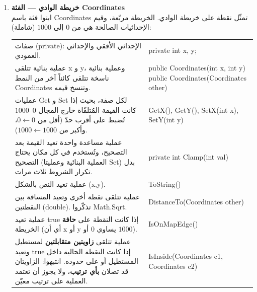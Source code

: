\documentclass[14pt]{extarticle}
\begin{document}
\begin{enumerate}[label=\textbf{تمرين \arabic*:}, wide=0pt, leftmargin=*, itemsep=2.2em]

    \item \textbf{خريطة الوادي — الفئة \textenglish{Coordinates}} \\
    ابنوا فئة باسم \textenglish{Coordinates} تمثّل نقطة على خريطة الوادي. الخريطة مربّعة، وقيم الإحداثيات الصالحة هي من $0$ إلى $1000$ (شاملة):

    {\centering
    \renewcommand{\arraystretch}{1.2}
    \small
    \begin{tabular}{|>{\raggedleft\arraybackslash}p{}|>{\raggedright\arraybackslash}p{}|}
    \hline
    \multicolumn{2}{|c|}{\textbf{الفئة: \textenglish{Coordinates}}} \\
    \hline
    صفات (\textenglish{private}): الإحداثي الأفقي والإحداثي العمودي. & \textenglish{private int x, y;} \\
    \hline
    عملية بنائية تتلقى \textenglish{x} و \textenglish{y}، وعملية بنائية ناسخة تتلقى كائناً آخر من النمط \textenglish{Coordinates} وتنسخ قيمه. & \textenglish{public Coordinates(int x, int y)} \newline \textenglish{public Coordinates(Coordinates other)} \\
    \hline
    عمليات \textenglish{Get} و \textenglish{Set} لكل صفة، بحيث إذا كانت القيمة المُتلقّاة خارج المجال $0$–$1000$ تُضبط على أقرب حدّ (أقل من $0 \leftarrow 0$، وأكبر من $1000 \leftarrow 1000$). & \textenglish{GetX(), GetY(), SetX(int x), SetY(int y)} \\
    \hline
    عملية مساعدة واحدة تعيد القيمة بعد التصحيح، وتُستخدم في كل مكان يحتاج التصحيح (العملية البنائية وعمليتا \textenglish{Set}) بدل تكرار الشروط ثلاث مرات. & \textenglish{private int Clamp(int val)} \\
    \hline
    عملية تعيد النص بالشكل \textenglish{(x,y)}. & \textenglish{ToString()} \\
    \hline
    عملية تتلقى نقطة أخرى وتعيد المسافة بين النقطتين (\textenglish{double}). تذكّروا \textenglish{Math.Sqrt}. & \textenglish{DistanceTo(Coordinates other)} \\
    \hline
    عملية تعيد \textenglish{true} إذا كانت النقطة على \textbf{حافة} الخريطة (أي أن \textenglish{x} أو \textenglish{y} يساوي $0$ أو $1000$). & \textenglish{IsOnMapEdge()} \\
    \hline
    عملية تتلقى \textbf{زاويتين متقابلتين} لمستطيل وتعيد \textenglish{true} إذا كانت النقطة الحالية داخل المستطيل أو على حدوده. انتبهوا: الزاويتان قد تصلان \textbf{بأي ترتيب}، ولا يجوز أن تعتمد العملية على ترتيب معيّن. & \textenglish{IsInside(Coordinates c1, Coordinates c2)} \\
    \hline
    \end{tabular}
    \par} %


\end{enumerate}
\end{document}
